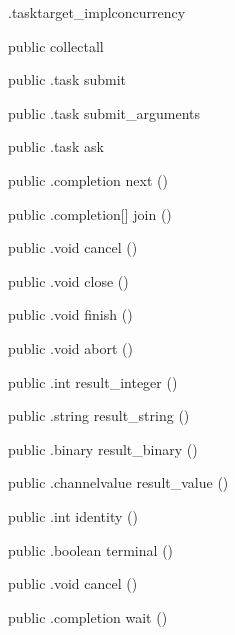 \begin{CrexxClass}{.tasktarget\_impl}{concurrency}
\begin{Members}
    \Factory
      {public}
      {collectall}
      {}

    \Method
      {public}
      {.task}
      {submit}
      {}

    \Method
      {public}
      {.task}
      {submit\_arguments}
      {}

    \Method
      {public}
      {.task}
      {ask}
      {}

    \Method
      {public}
      {.completion}
      {next}
      {()}

    \Method
      {public}
      {.completion[]}
      {join}
      {()}

    \Method
      {public}
      {.void}
      {cancel}
      {()}

    \Method
      {public}
      {.void}
      {close}
      {()}

    \Method
      {public}
      {.void}
      {finish}
      {()}

    \Method
      {public}
      {.void}
      {abort}
      {()}

    \Method
      {public}
      {.int}
      {result\_integer}
      {()}

    \Method
      {public}
      {.string}
      {result\_string}
      {()}

    \Method
      {public}
      {.binary}
      {result\_binary}
      {()}

    \Method
      {public}
      {.channelvalue}
      {result\_value}
      {()}

    \Method
      {public}
      {.int}
      {identity}
      {()}

    \Method
      {public}
      {.boolean}
      {terminal}
      {()}

    \Method
      {public}
      {.void}
      {cancel}
      {()}

    \Method
      {public}
      {.completion}
      {wait}
      {()}


\end{Members}
\end{CrexxClass}
